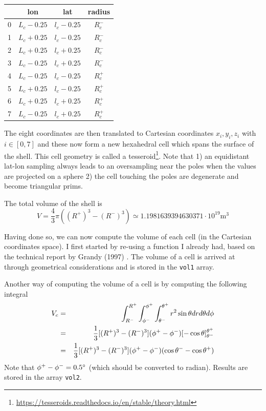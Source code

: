 \begin{tabular}{lccc}
\hline 
  & lon & lat & radius \\
\hline 
0 & $L_c-0.25$ & $l_c-0.25$ & $R_c^-$ \\
1 & $L_c+0.25$ & $l_c-0.25$ & $R_c^-$ \\
2 & $L_c+0.25$ & $l_c+0.25$ & $R_c^-$ \\
3 & $L_c-0.25$ & $l_c+0.25$ & $R_c^-$ \\
4 & $L_c-0.25$ & $l_c-0.25$ & $R_c^+$ \\
5 & $L_c+0.25$ & $l_c-0.25$ & $R_c^+$ \\
6 & $L_c+0.25$ & $l_c+0.25$ & $R_c^+$ \\
7 & $L_c-0.25$ & $l_c+0.25$ & $R_c^+$ \\
\hline 
\end{tabular} 

The eight coordinates are then translated to Cartesian coordinates $x_i,y_i,z_i$ with $i\in[0,7]$
and these now form a new hexahedral cell which spans the surface of the shell. 
This cell geometry is called a 
tesseroid\footnote{\url{https://tesseroids.readthedocs.io/en/stable/theory.html}}.
Note that 1) an equidistant lat-lon sampling always leads to an oversampling 
near the poles when the values are projected on a sphere 2) the cell touching the poles 
are degenerate and become triangular prims. 

The total volume of the shell is 
\[
V = \frac{4}{3}\pi ((R^+)^3-(R^-)^3) \simeq 1.1981639394630371 \cdot 10^{19} \si{\cubic\metre}
\]



Having done so, we can now compute the volume of each cell (in the Cartesian coordinates space). 
I first started by re-using a function I already had, based on the technical report by Grandy 
(1997) \cite{gran97}. The volume of a cell is arrived at through geometrical considerations and
is stored in the {\tt vol1} array. 

Another way of computing the volume of a cell is by computing the following integral
\begin{eqnarray}
V_c 
&=& \int_{R^-}^{R^+} \int_{\phi^-}^{\phi^+} \int_{\theta^-}^{\theta^+} r^2 \sin \theta dr d\theta d\phi \nonumber\\
&=& \frac{1}{3}[(R^+)^3-(R^-)^3] (\phi^+-\phi^-) [-\cos\theta]_{\theta^-}^{\theta^+} \nonumber\\
&=& \frac{1}{3}[(R^+)^3-(R^-)^3] (\phi^+-\phi^-) (\cos\theta^- -\cos\theta^+ )
\end{eqnarray}
Note that $\phi^+-\phi^- = 0.5\degree$ (which should be converted to radian). 
Results are stored in the array {\tt vol2}.

